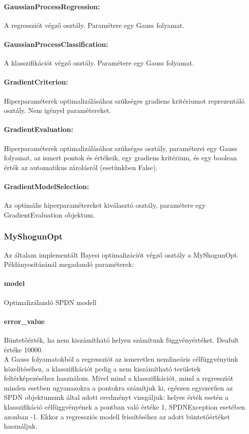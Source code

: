 \paragraph{GaussianProcessRegression:}
A regressziót végző osztály. Paramétere egy Gauss folyamat.
\paragraph{GaussianProcessClassification:}
A klasszifikációt végző osztály. Paramétere egy Gauss folyamat.
\paragraph{GradientCriterion:}
Hiperparaméterek optimalizálásához szükséges gradiens kritériumot reprezentáló osztály. Nem igényel paramétereket.
\paragraph{GradientEvaluation:}
Hiperparaméterek optimalizálásához szükséges osztály, paraméterei egy Gauss folyamat, az ismert pontok és értékeik, egy gradiens kritérium, és egy boolean érték az automatikus zárolásról (esetünkben False).
\paragraph{GradientModelSelection:}
Az optimális hiperparamétereket kiválasztó osztály, paramétere egy GradientEvaluation objektum.

\subsubsection{MyShogunOpt}

Az általam implementált Bayesi optimalizációt végző osztály a MyShogunOpt. Példányosításánál megadandó paraméterek:
\paragraph{model} Optimalizálandó SPDN modell
\paragraph{error\_value} Büntetőérték, ha nem kiszámítható helyen számítunk függvényértéket. Deafult értéke 10000.\\

A Gauss folyamatokból a regressziót az ismeretlen nemlineáris célfüggvényünk közelítéséhez, a klasszifikációt pedig a nem kiszámítható területek feltérképezéséhez használom. Mivel mind a klasszifikációt, mind a regressziót minden esetben ugyanazokra a pontokra számítjuk ki, egészen egyszerűen az SPDN objektumunk által adott eredményt vizsgáljuk: helyes érték esetén a klasszifikáció célfüggvényének a pontban való értéke 1, SPDNException esetében azonban -1. Ekkor a regressziós modell frissítéséhez az adott büntetőértéket használjuk.

